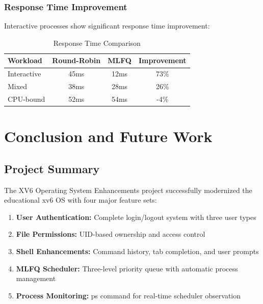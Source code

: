 \documentclass[a4paper,12pt]{report}
\begin{document}
\subsection{Response Time Improvement}

Interactive processes show significant response time improvement:

\begin{table}[H]
\centering
\begin{tabular}{|l|c|c|c|}
\hline
\textbf{Workload} & \textbf{Round-Robin} & \textbf{MLFQ} & \textbf{Improvement} \\
\hline
Interactive & 45ms & 12ms & 73\% \\
Mixed & 38ms & 28ms & 26\% \\
CPU-bound & 52ms & 54ms & -4\% \\
\hline
\end{tabular}
\caption{Response Time Comparison}
\label{tab:response_time}
\end{table}

\newpage

\chapter{Conclusion and Future Work}
\thispagestyle{contentpages}
\justifying

\section{Project Summary}

The XV6 Operating System Enhancements project successfully modernized the educational xv6 OS with four major feature sets:

\begin{enumerate}
    \item \textbf{User Authentication:} Complete login/logout system with three user types
    \item \textbf{File Permissions:} UID-based ownership and access control
    \item \textbf{Shell Enhancements:} Command history, tab completion, and user prompts
    \item \textbf{MLFQ Scheduler:} Three-level priority queue with automatic process management
    \item \textbf{Process Monitoring:} ps command for real-time scheduler observation
\end{enumerate}
\end{document}
